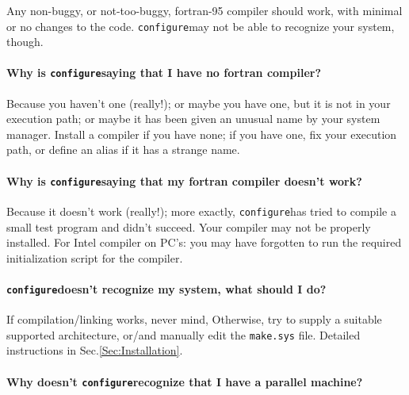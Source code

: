 \documentclass[12pt,a4paper]{article}
\def\configure{\texttt{configure}}
\begin{document}
Any non-buggy, or not-too-buggy, fortran-95 compiler should work,
with minimal or no changes to the code. \configure may not 
be able to recognize your system, though.

\paragraph{Why is \configure saying that I have no fortran compiler?}

Because you haven't one (really!); or maybe you have one, but it is not
in your execution path; or maybe it has been given an unusual name by your 
system manager. Install a compiler if you have none; if you have one, fix 
your execution path, or define an alias if it has a strange name.

\paragraph{Why is \configure saying that my fortran compiler doesn't work?}

Because it doesn't work (really!); more exactly, \configure has tried 
to compile a small test program and didn't succeed. Your compiler may not be 
properly installed. For Intel compiler on PC's: you may have forgotten to run 
the required initialization script for the compiler.

\paragraph{\configure doesn't recognize my system, what should I do?}

If compilation/linking works, never mind, Otherwise, try to supply a suitable  
supported architecture, or/and manually edit the \texttt{make.sys} file. 
Detailed instructions in Sec.\ref{Sec:Installation}.

\paragraph{Why doesn't \configure recognize that I have a parallel machine?}
\end{document}

